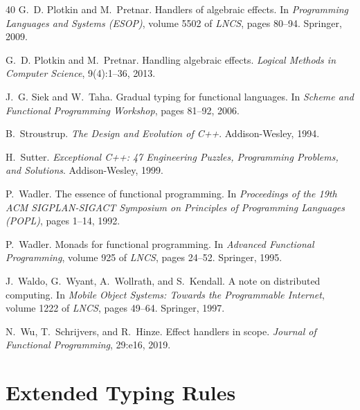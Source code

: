 \documentclass[11pt,twocolumn]{article}
\begin{document}
\begin{thebibliography}{40}
G.~D. Plotkin and M.~Pretnar.
\newblock Handlers of algebraic effects.
\newblock In \emph{Programming Languages and Systems (ESOP)}, volume 5502 of \emph{LNCS}, pages 80--94. Springer, 2009.

G.~D. Plotkin and M.~Pretnar.
\newblock Handling algebraic effects.
\newblock \emph{Logical Methods in Computer Science}, 9(4):1--36, 2013.

J.~G. Siek and W.~Taha.
\newblock Gradual typing for functional languages.
\newblock In \emph{Scheme and Functional Programming Workshop}, pages 81--92, 2006.

B.~Stroustrup.
\newblock \emph{The Design and Evolution of C++}.
\newblock Addison-Wesley, 1994.

H.~Sutter.
\newblock \emph{Exceptional C++: 47 Engineering Puzzles, Programming Problems, and Solutions}.
\newblock Addison-Wesley, 1999.

P.~Wadler.
\newblock The essence of functional programming.
\newblock In \emph{Proceedings of the 19th ACM SIGPLAN-SIGACT Symposium on Principles of Programming Languages (POPL)}, pages 1--14, 1992.

P.~Wadler.
\newblock Monads for functional programming.
\newblock In \emph{Advanced Functional Programming}, volume 925 of \emph{LNCS}, pages 24--52. Springer, 1995.

J.~Waldo, G.~Wyant, A.~Wollrath, and S.~Kendall.
\newblock A note on distributed computing.
\newblock In \emph{Mobile Object Systems: Towards the Programmable Internet}, volume 1222 of \emph{LNCS}, pages 49--64. Springer, 1997.

N.~Wu, T.~Schrijvers, and R.~Hinze.
\newblock Effect handlers in scope.
\newblock \emph{Journal of Functional Programming}, 29:e16, 2019.

\end{thebibliography}

\appendix
\section{Extended Typing Rules}\label{app:typing}
\end{document}
